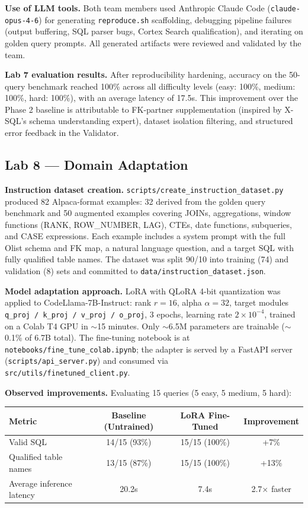 \documentclass[11pt,letterpaper]{article}
\begin{document}
\textbf{Use of LLM tools.} Both team members used Anthropic Claude Code (\texttt{claude-opus-4-6}) for generating \texttt{reproduce.sh} scaffolding, debugging pipeline failures (output buffering, SQL parser bugs, Cortex Search qualification), and iterating on golden query prompts. All generated artifacts were reviewed and validated by the team.

\textbf{Lab 7 evaluation results.} After reproducibility hardening, accuracy on the 50-query benchmark reached 100\% across all difficulty levels (easy: 100\%, medium: 100\%, hard: 100\%), with an average latency of 17.5s. This improvement over the Phase 2 baseline is attributable to FK-partner supplementation (inspired by X-SQL's schema understanding expert), dataset isolation filtering, and structured error feedback in the Validator.

\subsection{Lab 8 --- Domain Adaptation}

\textbf{Instruction dataset creation.} \texttt{scripts/create\_instruction\_dataset.py} produced 82 Alpaca-format examples: 32 derived from the golden query benchmark and 50 augmented examples covering JOINs, aggregations, window functions (RANK, ROW\_NUMBER, LAG), CTEs, date functions, subqueries, and CASE expressions. Each example includes a system prompt with the full Olist schema and FK map, a natural language question, and a target SQL with fully qualified table names. The dataset was split 90/10 into training (74) and validation (8) sets and committed to \texttt{data/instruction\_dataset.json}.

\textbf{Model adaptation approach.} LoRA with QLoRA 4-bit quantization was applied to CodeLlama-7B-Instruct: rank $r=16$, alpha $\alpha=32$, target modules \texttt{q\_proj / k\_proj / v\_proj / o\_proj}, 3 epochs, learning rate $2\times10^{-4}$, trained on a Colab T4 GPU in $\sim$15 minutes. Only $\sim$6.5M parameters are trainable ($\sim$0.1\% of 6.7B total). The fine-tuning notebook is at \texttt{notebooks/fine\_tune\_colab.ipynb}; the adapter is served by a FastAPI server (\texttt{scripts/api\_server.py}) and consumed via \\ \texttt{src/utils/finetuned\_client.py}.

\textbf{Observed improvements.} Evaluating 15 queries (5 easy, 5 medium, 5 hard):

\vspace{3pt}
\begin{center}\small
\begin{tabular}{@{}lccc@{}}
\toprule
\textbf{Metric} & \textbf{Baseline (Untrained)} & \textbf{LoRA Fine-Tuned} & \textbf{Improvement} \\
\midrule
Valid SQL & 14/15 (93\%) & 15/15 (100\%) & +7\% \\
Qualified table names & 13/15 (87\%) & 15/15 (100\%) & +13\% \\
Average inference latency & 20.2s & 7.4s & 2.7$\times$ faster \\
\bottomrule
\end{tabular}
\end{center}
\vspace{3pt}
\end{document}
